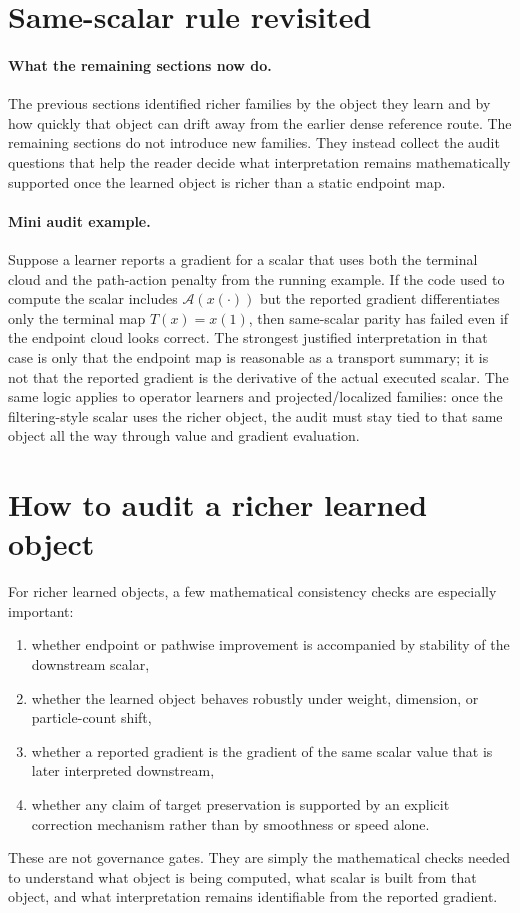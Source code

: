 \section{Same-scalar rule revisited}
\label{sec:bf-neural-ot-dynamic-same-scalar}

\paragraph{What the remaining sections now do.}
The previous sections identified richer families by the object they learn and by
how quickly that object can drift away from the earlier dense reference route.  The
remaining sections do not introduce new families.  They instead collect the audit
questions that help the reader decide what interpretation remains mathematically
supported once the learned object is richer than a static endpoint map.

\paragraph{Mini audit example.}
Suppose a learner reports a gradient for a scalar that uses both the terminal cloud
and the path-action penalty from the running example.  If the code used to compute
the scalar includes \(\mathcal A(x(\cdot))\) but the reported gradient differentiates
only the terminal map \(T(x)=x(1)\), then same-scalar parity has failed even if the
endpoint cloud looks correct.  The strongest justified interpretation in that case
is only that the endpoint map is reasonable as a transport summary; it is not that
the reported gradient is the derivative of the actual executed scalar.  The same
logic applies to operator learners and projected/localized families: once the
filtering-style scalar uses the richer object, the audit must stay tied to that same
object all the way through value and gradient evaluation.

\section{How to audit a richer learned object}
\label{sec:bf-neural-ot-dynamic-promotion}

For richer learned objects, a few mathematical consistency checks are especially
important:
\begin{enumerate}[label=(\roman*)]
  \item whether endpoint or pathwise improvement is accompanied by stability of
  the downstream scalar,
  \item whether the learned object behaves robustly under weight, dimension, or
  particle-count shift,
  \item whether a reported gradient is the gradient of the same scalar value that
  is later interpreted downstream,
  \item whether any claim of target preservation is supported by an explicit
  correction mechanism rather than by smoothness or speed alone.
\end{enumerate}
These are not governance gates.  They are simply the mathematical checks needed to
understand what object is being computed, what scalar is built from that object,
and what interpretation remains identifiable from the reported gradient.

